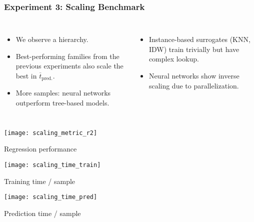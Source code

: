 \begin{frame}
	\frametitle{Experiment 3: Scaling Benchmark}
	\begin{columns}
		\begin{itemize}
			\item
				We observe a hierarchy.
			\item
				Best-performing families from the previous experiments also scale the
				best in $\overline{t}_\text{pred.}$.
			\item
				More samples: neural networks outperform tree-based models.
		\end{itemize}

		\begin{itemize}
			\item
				Instance-based surrogates (KNN, IDW) train trivially but have
				complex lookup.
			\item
				Neural networks show inverse scaling due to
				parallelization.
		\end{itemize}
	\end{columns}

	\vspace{1em}

	\begin{minipage}{0.32\textwidth}
		\texttt{[image: scaling\_metric\_r2]}
		\begin{center}
			\footnotesize
			\vspace{-10pt}
			\hspace{5pt} Regression performance
		\end{center}
	\end{minipage}
	\begin{minipage}{0.32\textwidth}
		\texttt{[image: scaling\_time\_train]}
		\begin{center}
			\footnotesize
			\vspace{-10pt}
			\hspace{5pt} Training time / sample
		\end{center}
	\end{minipage}
	\begin{minipage}{0.32\textwidth}
		\texttt{[image: scaling\_time\_pred]}
		\begin{center}
			\footnotesize
			\vspace{-10pt}
			\hspace{5pt} Prediction time / sample
		\end{center}
	\end{minipage}

\end{frame}

